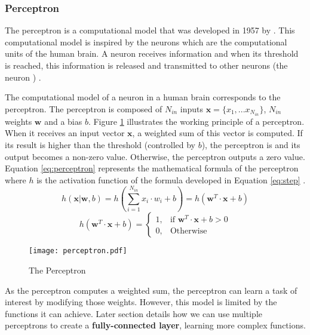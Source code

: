 \subsubsection{Perceptron} \label{subs:perceptron}
The perceptron is a computational model that was developed in 1957 by \textcite{rosenblatt_perceptron_1958}. This computational model is inspired by the neurons which are the computational units of the human brain. A neuron receives information and when its threshold is reached, this information is released and transmitted to other neurons (the neuron ) \cite{rosenblatt_perceptron_1958, matteucci_artificial_2019}.

The computational model of a neuron in a human brain corresponds to the perceptron. The perceptron is composed of $N_{in}$ inputs $\boldsymbol{x} = \{ x_1, ... x_{N_{in}} \}$, $N_{in}$ weights $\boldsymbol{w}$ and a bias $b$. Figure \ref{fig:perceptron} illustrates the working principle of a perceptron. When it receives an input vector $\boldsymbol{x}$, a weighted sum of this vector is computed. If its result is higher than the threshold (controlled by $b$), the perceptron is  and its output becomes a non-zero value. Otherwise, the perceptron outputs a zero value.
Equation \eqref{eq:perceptron} represents the mathematical formula of the perceptron where $h$ is the activation function of the formula developed in Equation \eqref{eq:step} \cite{matteucci_artificial_2019}.
%
\begin{equation}
    h ( \boldsymbol{x} | \boldsymbol{w}, b) = h \left( \sum^{N_{in}}_{i=1} x_i \cdot w_i + b \right) = h \left( \boldsymbol{w}^{T} \cdot \boldsymbol{x} + b \right)
    \label{eq:perceptron}
\end{equation}
%
\begin{equation}
    h ( \boldsymbol{w}^{T} \cdot \boldsymbol{x} + b) = \begin{cases} 1, & \mbox{if } \boldsymbol{w}^{T} \cdot \boldsymbol{x} + b > 0 \\ 0, & \mbox{Otherwise} \end{cases}
    \label{eq:step}
\end{equation}
%
\begin{figure}[H]
    \centering
    \texttt{[image: perceptron.pdf]}
    \caption{The Perceptron}
    \label{fig:perceptron}
\end{figure}
%
As the perceptron computes a weighted sum, the perceptron can learn a task of interest by modifying those weights. However, this model is limited by the functions it can achieve. Later section details how we can use multiple perceptrons to create a \textbf{fully-connected layer}, learning more complex functions.
